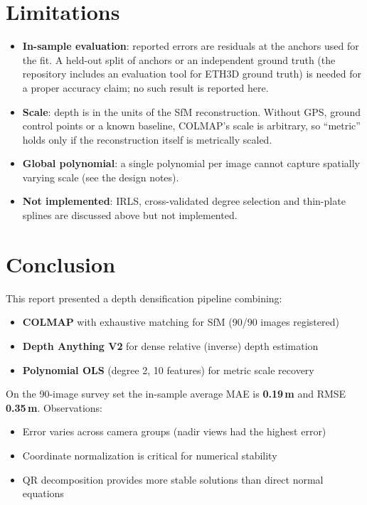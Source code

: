 \documentclass[11pt,a4paper]{article}
\begin{document}
\section{Limitations}
\label{sec:limits}

\begin{itemize}[noitemsep]
    \item \textbf{In-sample evaluation}: reported errors are residuals at the anchors used for the fit. A held-out split of anchors or an independent ground truth (the repository includes an evaluation tool for ETH3D ground truth) is needed for a proper accuracy claim; no such result is reported here.
    \item \textbf{Scale}: depth is in the units of the SfM reconstruction. Without GPS, ground control points or a known baseline, COLMAP's scale is arbitrary, so ``metric'' holds only if the reconstruction itself is metrically scaled.
    \item \textbf{Global polynomial}: a single polynomial per image cannot capture spatially varying scale (see the design notes).
    \item \textbf{Not implemented}: IRLS, cross-validated degree selection and thin-plate splines are discussed above but not implemented.
\end{itemize}

\section{Conclusion}

This report presented a depth densification pipeline combining:
\begin{itemize}[noitemsep]
    \item \textbf{COLMAP} with exhaustive matching for SfM (90/90 images registered)
    \item \textbf{Depth Anything V2} for dense relative (inverse) depth estimation
    \item \textbf{Polynomial OLS} (degree 2, 10 features) for metric scale recovery
\end{itemize}

On the 90-image survey set the in-sample average MAE is \textbf{0.19\,m} and RMSE \textbf{0.35\,m}. Observations:
\begin{itemize}[noitemsep]
    \item Error varies across camera groups (nadir views had the highest error)
    \item Coordinate normalization is critical for numerical stability
    \item QR decomposition provides more stable solutions than direct normal equations
\end{itemize}
\end{document}
